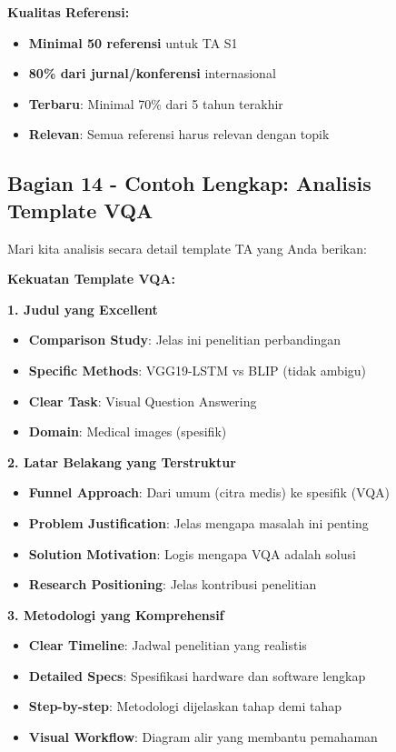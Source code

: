 \textbf{Kualitas Referensi:}
\begin{itemize}
    \item \textbf{Minimal 50 referensi} untuk TA S1
    \item \textbf{80\% dari jurnal/konferensi} internasional
    \item \textbf{Terbaru}: Minimal 70\% dari 5 tahun terakhir
    \item \textbf{Relevan}: Semua referensi harus relevan dengan topik
\end{itemize}

\subsection*{Bagian 14 - Contoh Lengkap: Analisis Template VQA}

Mari kita analisis secara detail template TA yang Anda berikan:

\textbf{Kekuatan Template VQA:}

\textbf{1. Judul yang Excellent}
\begin{itemize}
    \item \textbf{Comparison Study}: Jelas ini penelitian perbandingan
    \item \textbf{Specific Methods}: VGG19-LSTM vs BLIP (tidak ambigu)
    \item \textbf{Clear Task}: Visual Question Answering
    \item \textbf{Domain}: Medical images (spesifik)
\end{itemize}

\textbf{2. Latar Belakang yang Terstruktur}
\begin{itemize}
    \item \textbf{Funnel Approach}: Dari umum (citra medis) ke spesifik (VQA)
    \item \textbf{Problem Justification}: Jelas mengapa masalah ini penting
    \item \textbf{Solution Motivation}: Logis mengapa VQA adalah solusi
    \item \textbf{Research Positioning}: Jelas kontribusi penelitian
\end{itemize}

\textbf{3. Metodologi yang Komprehensif}
\begin{itemize}
    \item \textbf{Clear Timeline}: Jadwal penelitian yang realistis
    \item \textbf{Detailed Specs}: Spesifikasi hardware dan software lengkap
    \item \textbf{Step-by-step}: Metodologi dijelaskan tahap demi tahap
    \item \textbf{Visual Workflow}: Diagram alir yang membantu pemahaman
\end{itemize}

